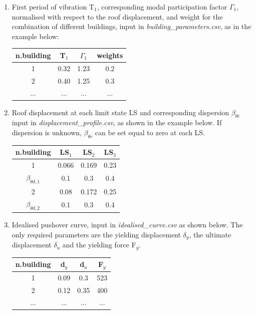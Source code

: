 \begin{enumerate}
\item First period of vibration T$_1$, corresponding modal participation factor $\Gamma_1$, normalised with respect to the roof displacement, and weight for the combination of different buildings, input in \textit{building\_parameters.csv}, as in the example below:
	\begin{table}[H]
	\centering
	\begin{tabular}{|c|c|c|c|} \hline
	\textbf{n.building} & \textbf{T$_1$} & \textbf{$\Gamma_1$} & \textbf{weights}\\ \hline
	1 & 0.32 & 1.23 & 0.2\\ \hline
	2 & 0.40 & 1.25 & 0.3\\ \hline
	... & ... & ... & ... \\ \hline
	\end{tabular}
	\end{table}
	
\item Roof displacement at each limit state LS and corresponding dispersion $\beta_{\theta c}$ input in \textit{displacement\_profile.csv}, as shown in the example below. If dispersion is unknown, $\beta_{\theta c}$ can be set equal to zero at each LS.
	\begin{table}[H]
	\centering
	\begin{tabular}{|c|c|c|c|} \hline
	\textbf{n.building} & \textbf{LS$_1$} &	\textbf{LS$_2$} &	\textbf{LS$_3$} \\ \hline
	1 & 0.066 & 0.169 & 0.23\\ \hline
	$\beta_{\theta d, 1}$ & 0.1 & 0.3 & 0.4\\ \hline
	2 & 0.08 & 0.172 & 0.25\\ \hline
	$\beta_{\theta d, 2}$ & 0.1 & 0.3 & 0.4\\ \hline	
	\end{tabular}
	\end{table}
	
\item Idealised pushover curve, input in \textit{idealised\_curve.csv} as shown below. The only required parameters are the yielding displacement $\delta_y$, the ultimate displacement $\delta_u$ and the yielding force F$_y$.

\begin{table}[H]
\centering
\begin{tabular}{|c|c|c|c|} \hline
\textbf{n.building} & \textbf{d$_y$} & \textbf{d$_u$} & \textbf{F$_y$} \\ \hline
1 & 0.09	& 0.3	 & 523\\ \hline
2 & 0.12	& 0.35	 & 400\\ \hline
... & ...	& ... & ...\\ \hline
\end{tabular}
\end{table}


\end{enumerate}
